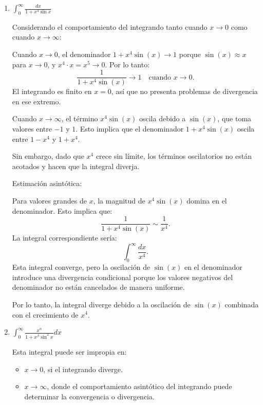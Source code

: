 \documentclass{article}
\begin{document}
\begin{enumerate}
\begin{enumerate}
Por lo tanto, la integral se transforma en:
\[
\int_{1}^{\infty} \frac{dx}{x\sqrt{x^2 - 1}} = \int_{0}^{\pi/2} du.
\]

Al evaluar la nueva integral:
\[
\int_{0}^{\pi/2} du = [u]_{0}^{\pi/2} = \frac{\pi}{2} - 0 = \frac{\pi}{2}.
\]
Por lo tanto la integral converge, y su valor es \( \frac{\pi}{2} \).

		\item $ \int_{0}^{\infty}\frac{dx}{1+x^4 \sin x } $
\[\]        

Considerando el comportamiento del integrando tanto cuando \( x \to 0 \) como cuando \( x \to \infty \):

Cuando \( x \to 0 \), el denominador \( 1 + x^4 \sin(x) \to 1 \) porque \( \sin(x) \approx x \) para \( x \to 0 \), y \( x^4 \cdot x = x^5 \to 0 \). Por lo tanto:
\[
\frac{1}{1 + x^4 \sin(x)} \to 1 \quad \text{cuando } x \to 0.
\]
El integrando es finito en \( x = 0 \), así que no presenta problemas de divergencia en ese extremo.

Cuando \( x \to \infty \), el término \( x^4 \sin(x) \) oscila debido a \( \sin(x) \), que toma valores entre \(-1\) y \(1\). Esto implica que el denominador \( 1 + x^4 \sin(x) \) oscila entre \( 1 - x^4 \) y \( 1 + x^4 \). 

Sin embargo, dado que \( x^4 \) crece sin límite, los términos oscilatorios no están acotados y hacen que la integral diverja.

Estimación asintótica:

Para valores grandes de \( x \), la magnitud de \( x^4 \sin(x) \) domina en el denominador. Esto implica que:
\[
\frac{1}{1 + x^4 \sin(x)} \sim \frac{1}{x^4}.
\]
La integral correspondiente sería:
\[
\int_{0}^{\infty} \frac{dx}{x^4}.
\]
Esta integral converge, pero la oscilación de \( \sin(x) \) en el denominador introduce una divergencia condicional porque los valores negativos del denominador no están cancelados de manera uniforme.

Por lo tanto, la integral diverge debido a la oscilación de \( \sin(x) \) combinada con el crecimiento de \( x^4 \).

		\item $ \int_{0}^{\infty} \frac{x^\alpha}{1+x^\beta\sin^2x}dx $
\[\]       

Esta integral puede ser impropia en:
\begin{itemize}
    \item \( x \to 0 \), si el integrando diverge.
    \item \( x \to \infty \), donde el comportamiento asintótico del integrando puede determinar la convergencia o divergencia.
\end{itemize}


\end{enumerate}
\end{enumerate}
\end{document}
